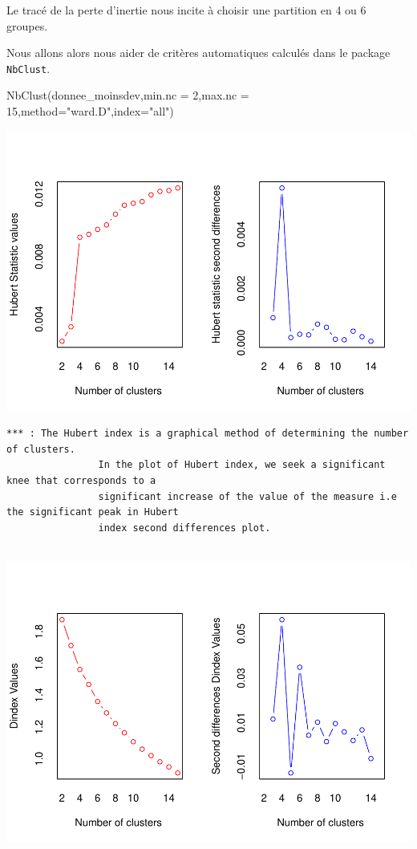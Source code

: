 \documentclass[
]{article}
\newenvironment{Shaded}{}{}
\newcommand{\AttributeTok}[1]{#1}
\newcommand{\DecValTok}[1]{#1}
\newcommand{\FunctionTok}[1]{#1}
\newcommand{\NormalTok}[1]{#1}
\newcommand{\StringTok}[1]{\textcolor[rgb]{0.00,0.50,0.50}{#1}}
\begin{document}
Le tracé de la perte d'inertie nous incite à choisir une partition en 4
ou 6 groupes.

Nous allons alors nous aider de critères automatiques calculés dans le
package \texttt{NbClust}.

\begin{Shaded}
\begin{Highlighting}[]
\FunctionTok{NbClust}\NormalTok{(donnee\_moinsdev,}\AttributeTok{min.nc =} \DecValTok{2}\NormalTok{,}\AttributeTok{max.nc =} \DecValTok{15}\NormalTok{,}\AttributeTok{method=}\StringTok{"ward.D"}\NormalTok{,}\AttributeTok{index=}\StringTok{"all"}\NormalTok{)}
\end{Highlighting}
\end{Shaded}

\includegraphics{Projet_files/figure-latex/unnamed-chunk-30-1.pdf}

\begin{verbatim}
*** : The Hubert index is a graphical method of determining the number of clusters.
                In the plot of Hubert index, we seek a significant knee that corresponds to a 
                significant increase of the value of the measure i.e the significant peak in Hubert
                index second differences plot. 
 
\end{verbatim}

\includegraphics{Projet_files/figure-latex/unnamed-chunk-30-2.pdf}
\end{document}

